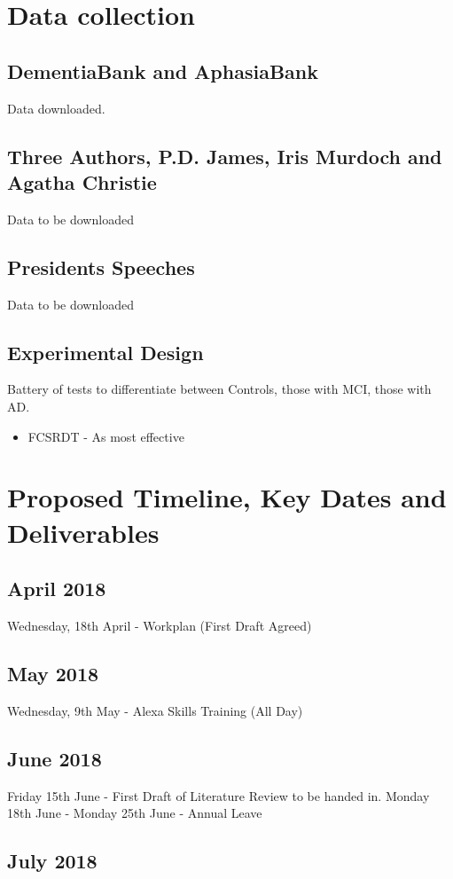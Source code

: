\documentclass{article}
\begin{document}
	\section{Data collection}
	\subsection{DementiaBank and AphasiaBank}
	Data downloaded.
	
	\subsection {Three Authors, P.D. James, Iris Murdoch and Agatha Christie}	
	Data to be downloaded
	
	\subsection{Presidents Speeches}
	Data to be downloaded
	
	\subsection{Experimental Design}
	Battery of tests to differentiate between Controls, those with MCI, those with AD. 
	\begin{itemize}
		\item FCSRDT - As most effective 
	\end{itemize}
	
	
	\section{Proposed Timeline, Key Dates and Deliverables}
	\subsection{April 2018}
	Wednesday, 18th April - Workplan (First Draft Agreed)
	\subsection{May 2018}
	Wednesday, 9th May - Alexa Skills Training (All Day)
	\subsection{June 2018}
	Friday 15th June - First Draft of Literature Review to be handed in.
	\newline
	Monday 18th June - Monday 25th June - Annual Leave
	\subsection{July 2018}
	
\end{document}
